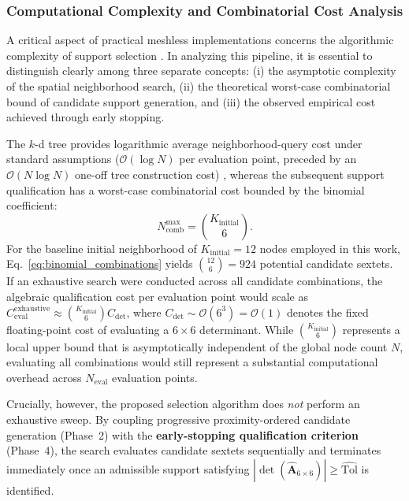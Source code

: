 \documentclass[preprint,12pt]{elsarticle}
\begin{document}
\subsubsection{Computational Complexity and Combinatorial Cost Analysis}
\label{subsubsec:computational_complexity}

A critical aspect of practical meshless implementations concerns the algorithmic complexity of support selection \cite{slak2018refined}. In analyzing this pipeline, it is essential to distinguish clearly among three separate concepts: (i) the asymptotic complexity of the spatial neighborhood search, (ii) the theoretical worst-case combinatorial bound of candidate support generation, and (iii) the observed empirical cost achieved through early stopping.

The $k$-d tree provides logarithmic average neighborhood-query cost under standard assumptions ($\mathcal{O}(\log N)$ per evaluation point, preceded by an $\mathcal{O}(N \log N)$ one-off tree construction cost) \cite{bentley1975multidimensional, parreira2006efficient, fasshauer2007meshfree}, whereas the subsequent support qualification has a worst-case combinatorial cost bounded by the binomial coefficient:
\begin{equation}
N_{\mathrm{comb}}^{\mathrm{max}} = \binom{K_{\mathrm{initial}}}{6}.
\label{eq:binomial_combinations}
\end{equation}
For the baseline initial neighborhood of $K_{\mathrm{initial}} = 12$ nodes employed in this work, Eq.~\eqref{eq:binomial_combinations} yields $\binom{12}{6} = 924$ potential candidate sextets. If an exhaustive search were conducted across all candidate combinations, the algebraic qualification cost per evaluation point would scale as $C_{\mathrm{eval}}^{\mathrm{exhaustive}} \approx \binom{K_{\mathrm{initial}}}{6} C_{\det}$, where $C_{\det} \sim \mathcal{O}(6^3) = \mathcal{O}(1)$ denotes the fixed floating-point cost of evaluating a $6 \times 6$ determinant. While $\binom{K_{\mathrm{initial}}}{6}$ represents a local upper bound that is asymptotically independent of the global node count $N$, evaluating all combinations would still represent a substantial computational overhead across $N_{\mathrm{eval}}$ evaluation points.

Crucially, however, the proposed selection algorithm does \emph{not} perform an exhaustive sweep. By coupling progressive proximity-ordered candidate generation (Phase~2) with the \textbf{early-stopping qualification criterion} (Phase~4), the search evaluates candidate sextets sequentially and terminates immediately once an admissible support satisfying $|\det(\widehat{\mathbf{A}}_{6 \times 6})| \ge \widehat{\mathrm{Tol}}$ is identified. 
\end{document}
